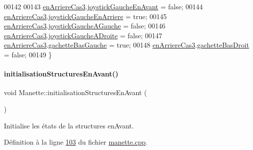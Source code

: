 \begin{DoxyCode}
00142 
00143     \hyperlink{class_manette_a2dfc47df38251abd34a495005eae6572}{enArriereCas3}.\hyperlink{struct_etat_manette_deplacement_a8c8e3ca694408bc6a6ced4e20b9da0be}{joystickGaucheEnAvant} = \textcolor{keyword}{false};
00144     \hyperlink{class_manette_a2dfc47df38251abd34a495005eae6572}{enArriereCas3}.\hyperlink{struct_etat_manette_deplacement_a584cf1538425c87588c5b96b79c8d482}{joystickGaucheEnArriere} = \textcolor{keyword}{true};
00145     \hyperlink{class_manette_a2dfc47df38251abd34a495005eae6572}{enArriereCas3}.\hyperlink{struct_etat_manette_deplacement_af7e92a8d8f116e2bc4a5a95386f604e7}{joystickGaucheAGauche} = \textcolor{keyword}{false};
00146     \hyperlink{class_manette_a2dfc47df38251abd34a495005eae6572}{enArriereCas3}.\hyperlink{struct_etat_manette_deplacement_a8fa93da5af430ac00ffd4ee8b76987a2}{joystickGaucheADroite} = \textcolor{keyword}{false};
00147     \hyperlink{class_manette_a2dfc47df38251abd34a495005eae6572}{enArriereCas3}.\hyperlink{struct_etat_manette_deplacement_a0d197e25bc2e0402a068a8d012c25472}{gachetteBasGauche} = \textcolor{keyword}{true};
00148     \hyperlink{class_manette_a2dfc47df38251abd34a495005eae6572}{enArriereCas3}.\hyperlink{struct_etat_manette_deplacement_a4588620c1e2a3543ce67c9a791aac106}{gachetteBasDroit} = \textcolor{keyword}{false};
00149 \}
\end{DoxyCode}
\mbox{\label{class_manette_afd5504555886e0abf89347b4f8d57fe0}} 
\paragraph{\texorpdfstring{initialisation\+Structures\+En\+Avant()}{initialisationStructuresEnAvant()}}
{\footnotesize\ttfamily void Manette\+::initialisation\+Structures\+En\+Avant (\begin{DoxyParamCaption}{ }\end{DoxyParamCaption})\hspace{0.3cm}{\ttfamily [private]}}



Initialise les états de la structures en\+Avant. 



Définition à la ligne \hyperlink{manette_8cpp_source_l00103}{103} du fichier \hyperlink{manette_8cpp_source}{manette.\+cpp}.




